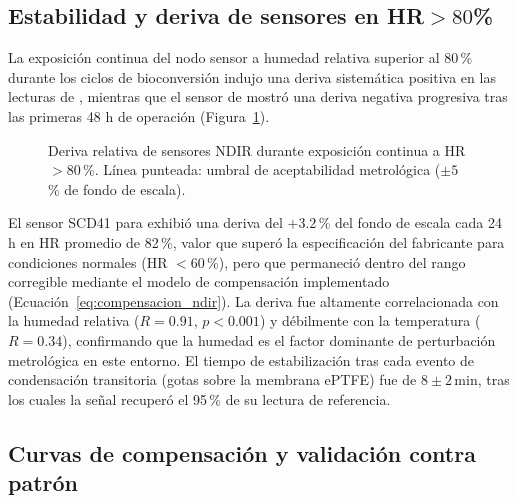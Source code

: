 \subsection{Estabilidad y deriva de sensores en HR$>80$\%}
\label{subsec:cap2_deriva_sensores}

La exposición continua del nodo sensor a humedad relativa superior al
80\,\% durante los ciclos de bioconversión indujo una deriva
sistemática positiva en las lecturas de , mientras que el
sensor de  mostró una deriva negativa progresiva tras las
primeras 48 h de operación (Figura~\ref{fig:deriva_sensores}).

\begin{figure}[htbp]
\centering
\caption{Deriva relativa de sensores NDIR durante exposición continua
a HR $> 80$\,\%. Línea punteada: umbral de aceptabilidad metrológica
($\pm 5$\,\% de fondo de escala).}
\label{fig:deriva_sensores}
\end{figure}

El sensor SCD41 para  exhibió una deriva del $+3.2$\,\% del
fondo de escala cada 24 h en HR promedio de 82\,\%, valor que superó
la especificación del fabricante para condiciones normales (HR $< 60$\,\%),
pero que permaneció dentro del rango corregible mediante el modelo de
compensación implementado (Ecuación~\ref{eq:compensacion_ndir}). La
deriva fue altamente correlacionada con la humedad relativa ($R = 0.91$,
$p < 0.001$) y débilmente con la temperatura ($R = 0.34$), confirmando
que la humedad es el factor dominante de perturbación metrológica en
este entorno. El tiempo de estabilización tras cada evento de
condensación transitoria (gotas sobre la membrana ePTFE) fue de
$8 \pm 2$\,min, tras los cuales la señal recuperó el 95\,\% de su
lectura de referencia.

\subsection{Curvas de compensación y validación contra patrón}
\label{subsec:cap2_compensacion_validacion}

